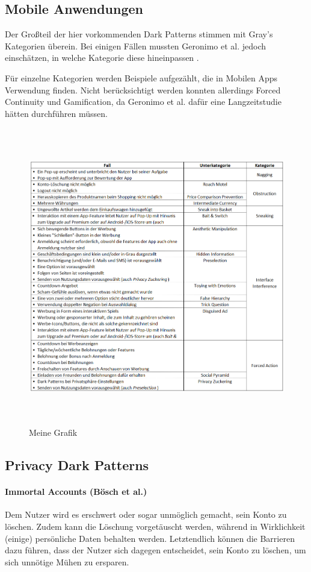 \documentclass[a4paper]{article}
\begin{document}
\subsection{Mobile Anwendungen}
\label{sub:mobile_anwendungen}
Der Großteil der hier vorkommenden Dark Patterns stimmen mit Gray's Kategorien überein. Bei einigen Fällen mussten Geronimo et al. jedoch einschätzen, in welche Kategorie diese hineinpassen \cite{geronimo}.

Für einzelne Kategorien werden Beispiele aufgezählt, die in Mobilen Apps Verwendung finden. Nicht berücksichtigt werden konnten allerdings Forced Continuity und Gamification, da Geronimo et al. dafür eine Langzeitstudie hätten durchführen müssen.\newline
\begin{figure}[h]
 \includegraphics[width=15cm,height=13cm]{"dark_patterns_mobile_ui2"}
 \caption{Meine Grafik}
 \label{fig:meine-grafik}
\end{figure}



\subsection{Privacy Dark Patterns}
\label{sub:privacy_dark_patterns}

\paragraph{Immortal Accounts (Bösch et al.)}
Dem Nutzer wird es erschwert oder sogar unmöglich gemacht, sein Konto zu löschen. Zudem kann die Löschung vorgetäuscht werden, während in Wirklichkeit (einige) persönliche Daten behalten werden. Letztendlich können die Barrieren dazu führen, dass der Nutzer sich dagegen entscheidet, sein Konto zu löschen, um sich unnötige Mühen zu ersparen. 
\end{document}
